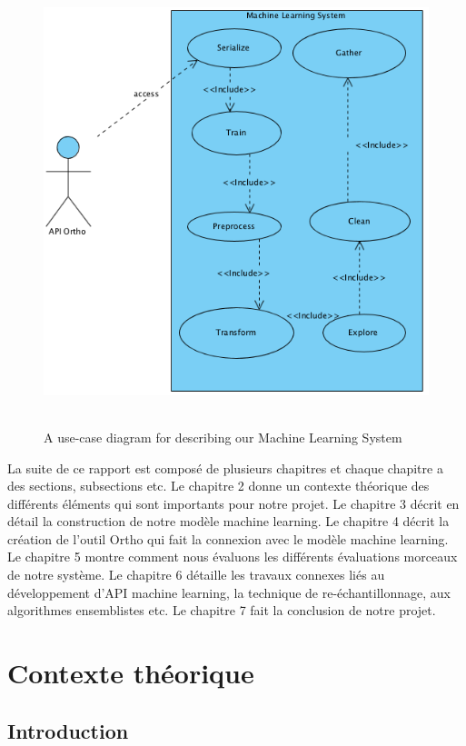 \documentclass[12pt, french]{report}
\begin{document}
\begin{figure}[h]
	\includegraphics[width=13cm, height =13cm]{images/APIML.png}
	\caption{A use-case diagram for describing our Machine Learning System}
	\label{MLUseCase}
\end{figure} 

La suite de ce rapport est composé de plusieurs chapitres et chaque chapitre a des sections, subsections etc. Le chapitre 2 donne un contexte théorique des différents éléments qui sont importants pour notre projet. Le chapitre 3 décrit en détail la construction de notre modèle machine learning. Le chapitre 4 décrit la création de l'outil Ortho qui fait la connexion avec le modèle machine learning. Le chapitre 5 montre comment nous évaluons les différents évaluations morceaux de notre système. Le chapitre 6 détaille les travaux connexes liés au développement d'API machine learning, la technique de re-échantillonnage, aux algorithmes ensemblistes etc. Le chapitre 7 fait la conclusion de notre projet.


\newpage

\chapter{Contexte théorique} \label{chap:background}
\section{Introduction}
\end{document}
